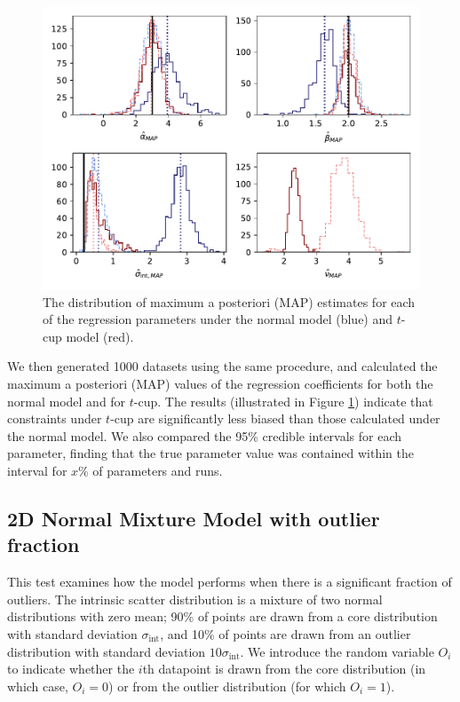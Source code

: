 \documentclass[fleqn,usenatbib]{mnras}
\begin{document}
\begin{figure}
    \includegraphics[width=\columnwidth]{graphics/outlier_many.pdf}
    \caption{The distribution of maximum a posteriori (MAP) estimates for each
    of the regression parameters under the normal model (blue) and $t$-cup model
    (red).}
    \label{fig:results.outlier.map}
\end{figure}

We then generated 1000 datasets using the same procedure, and
calculated the maximum a posteriori (MAP) values of the regression coefficients
for both the normal model and for $t$-cup. The results (illustrated in Figure
\ref{fig:results.outlier.map}) indicate that {\color{red} constraints under
$t$-cup are significantly less biased than those calculated under the normal
model. We also compared the 95\% credible intervals for each parameter,
finding that the true parameter value was contained within the interval for
$x$\% of parameters and runs.
}

\subsection{2D Normal Mixture Model with outlier fraction}
\label{sec:results.gmm}

This test examines how the model performs when there is a significant fraction
of outliers. The intrinsic scatter distribution is a mixture of two normal
distributions with zero mean; 90\% of points are drawn from a core distribution
with standard deviation $\sigma_\textrm{int}$, and 10\% of points are drawn from
an outlier distribution with standard deviation $10 \sigma_\textrm{int}$. We
introduce the random variable $O_i$ to indicate whether the $i$th datapoint is
drawn from the core distribution (in which case, $O_i = 0$) or from the outlier
distribution (for which $O_i = 1$).
\end{document}
